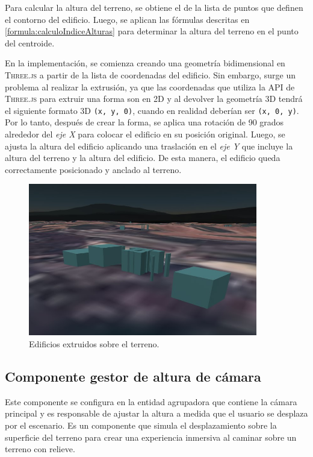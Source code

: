 \documentclass[a4paper, 11pt]{book}
\begin{document}
Para calcular la altura del terreno, se obtiene el  de la lista de puntos que definen el contorno del edificio. Luego, se aplican las fórmulas descritas en \ref{formula:calculoIndiceAlturas} para determinar la altura del terreno en el punto del centroide.

En la implementación, se comienza creando una geometría bidimensional en \textsc{Three.js} a partir de la lista de coordenadas del edificio. Sin embargo, surge un problema al realizar la extrusión, ya que las coordenadas que utiliza la \textsc{API} de \textsc{Three.js} para extruir una forma son en \textsc{2D} y al devolver la geometría \textsc{3D} tendrá el siguiente formato \textsc{3D} \texttt{(x, y, 0)}, cuando en realidad deberían ser \texttt{(x, 0, y)}. 
Por lo tanto, después de crear la forma, se aplica una rotación de 90 grados alrededor del \emph{eje X} para colocar el edificio en su posición original. Luego, se ajusta la altura del edificio aplicando una traslación en el \emph{eje Y} que incluye la altura del terreno y la altura del edificio. De esta manera, el edificio queda correctamente posicionado y anclado al terreno.

\begin{figure}[h]
  \centering
  \includegraphics[width=10cm, keepaspectratio]{img/buildings.jpg}
  \caption{Edificios extruidos sobre el terreno.}
  \label{fig:buildings}
\end{figure}
\subsection{Componente gestor de altura de cámara}
\label{subsec:cameraHeight}
Este componente se configura en la entidad agrupadora que contiene la cámara principal y es responsable de ajustar la altura a medida que el usuario se desplaza por el escenario. Es un componente que simula el desplazamiento sobre la superficie del terreno para crear una experiencia inmersiva al caminar sobre un terreno con relieve.
\end{document}
